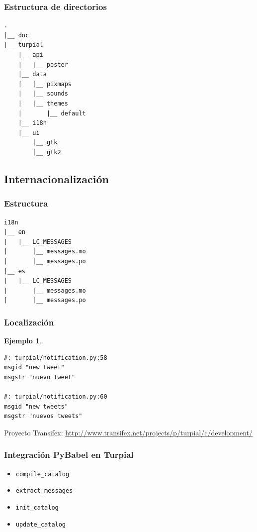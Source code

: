 \documentclass{beamer}
\newtheorem{ejemplo}{Ejemplo}
\begin{document}
\begin{frame}[fragile]

\frametitle{Estructura de directorios}

\begin{verbatim}
.
|__ doc
|__ turpial
    |__ api
    |   |__ poster
    |__ data
    |   |__ pixmaps
    |   |__ sounds
    |   |__ themes
    |       |__ default
    |__ i18n
    |__ ui
        |__ gtk
        |__ gtk2
\end{verbatim}
\end{frame}

\subsection{Internacionalización}

\begin{frame}[fragile]
\frametitle{Estructura}

\begin{verbatim}
i18n
|__ en
|   |__ LC_MESSAGES
|       |__ messages.mo
|       |__ messages.po
|__ es
|   |__ LC_MESSAGES
|       |__ messages.mo
|       |__ messages.po
\end{verbatim}
\end{frame}

\begin{frame}[fragile]
\frametitle{Localización}

\begin{ejemplo}
\begin{verbatim}
#: turpial/notification.py:58
msgid "new tweet"
msgstr "nuevo tweet"

#: turpial/notification.py:60
msgid "new tweets"
msgstr "nuevos tweets"
\end{verbatim}
\end{ejemplo}
Proyecto Transifex: \url{http://www.transifex.net/projects/p/turpial/c/development/}
\end{frame}

\begin{frame}
\frametitle{Integración PyBabel en Turpial}

\begin{itemize}
    \item \texttt{compile\_catalog}
    \item \texttt{extract\_messages}
    \item \texttt{init\_catalog}
    \item \texttt{update\_catalog}
\end{itemize}
\end{frame}
\end{document}
